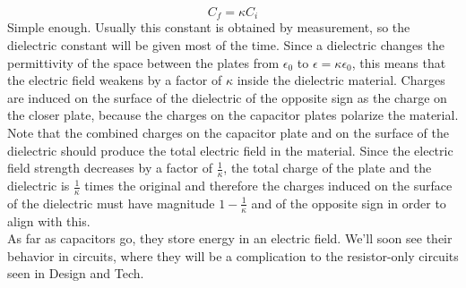 \[
	C_f = \kappa C_i
\]
Simple enough. Usually this constant is obtained by measurement, so the dielectric constant will be given most of the time. Since a dielectric changes the permittivity of the space between the plates from $\epsilon_0$ to $\epsilon = \kappa \epsilon_0$, this means that the electric field weakens by a factor of $\kappa$ inside the dielectric material. Charges are induced on the surface of the dielectric of the opposite sign as the charge on the closer plate, because the charges on the capacitor plates polarize the material. Note that the combined charges on the capacitor plate and on the surface of the dielectric should produce the total electric field in the material. Since the electric field strength decreases by a factor of $\frac{1}{\kappa}$, the total charge of the plate and the dielectric is $\frac{1}{\kappa}$ times the original and therefore the charges induced on the surface of the dielectric must have magnitude  $1 - \frac{1}{\kappa}$ and of the opposite sign in order to align with this. \\
As far as capacitors go, they store energy in an electric field. We'll soon see their behavior in circuits, where they will be a complication to the resistor-only circuits seen in Design and Tech. 
